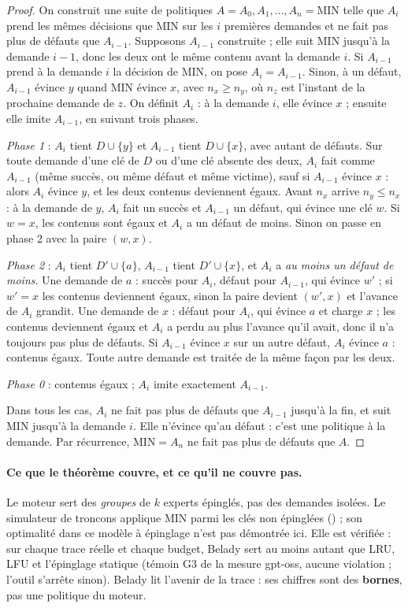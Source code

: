 \begin{proof}
On construit une suite de politiques $A = A_0, A_1, \ldots, A_n = \mathrm{MIN}$ telle que $A_i$ prend les mêmes décisions que MIN sur les $i$ premières demandes et ne fait pas plus de défauts que $A_{i-1}$. Supposons $A_{i-1}$ construite ; elle suit MIN jusqu'à la demande $i-1$, donc les deux ont le même contenu avant la demande $i$. Si $A_{i-1}$ prend à la demande $i$ la décision de MIN, on pose $A_i = A_{i-1}$. Sinon, à un défaut, $A_{i-1}$ évince $y$ quand MIN évince $x$, avec $n_x \ge n_y$, où $n_z$ est l'instant de la prochaine demande de $z$. On définit $A_i$ : à la demande $i$, elle évince $x$ ; ensuite elle imite $A_{i-1}$, en suivant trois phases.

\emph{Phase 1} : $A_i$ tient $D \cup \{y\}$ et $A_{i-1}$ tient $D \cup \{x\}$, avec autant de défauts. Sur toute demande d'une clé de $D$ ou d'une clé absente des deux, $A_i$ fait comme $A_{i-1}$ (même succès, ou même défaut et même victime), sauf si $A_{i-1}$ évince $x$ : alors $A_i$ évince $y$, et les deux contenus deviennent égaux. Avant $n_x$ arrive $n_y \le n_x$ : à la demande de $y$, $A_i$ fait un succès et $A_{i-1}$ un défaut, qui évince une clé $w$. Si $w = x$, les contenus sont égaux et $A_i$ a un défaut de moins. Sinon on passe en phase 2 avec la paire $(w, x)$.

\emph{Phase 2} : $A_i$ tient $D' \cup \{a\}$, $A_{i-1}$ tient $D' \cup \{x\}$, et $A_i$ a \emph{au moins un défaut de moins}. Une demande de $a$ : succès pour $A_i$, défaut pour $A_{i-1}$, qui évince $w'$ ; si $w' = x$ les contenus deviennent égaux, sinon la paire devient $(w', x)$ et l'avance de $A_i$ grandit. Une demande de $x$ : défaut pour $A_i$, qui évince $a$ et charge $x$ ; les contenus deviennent égaux et $A_i$ a perdu au plus l'avance qu'il avait, donc il n'a toujours pas plus de défauts. Si $A_{i-1}$ évince $x$ sur un autre défaut, $A_i$ évince $a$ : contenus égaux. Toute autre demande est traitée de la même façon par les deux.

\emph{Phase 0} : contenus égaux ; $A_i$ imite exactement $A_{i-1}$.

Dans tous les cas, $A_i$ ne fait pas plus de défauts que $A_{i-1}$ jusqu'à la fin, et suit MIN jusqu'à la demande $i$. Elle n'évince qu'au défaut : c'est une politique à la demande. Par récurrence, $\mathrm{MIN} = A_n$ ne fait pas plus de défauts que $A$.
\end{proof}

\paragraph{Ce que le théorème couvre, et ce qu'il ne couvre pas.} Le moteur sert des \emph{groupes} de $k$ experts épinglés, pas des demandes isolées. Le simulateur de troncons applique MIN parmi les clés non épinglées () ; son optimalité dans ce modèle à épinglage n'est pas démontrée ici. Elle est vérifiée : sur chaque trace réelle et chaque budget, Belady sert au moins autant que LRU, LFU et l'épinglage statique (témoin G3 de la mesure gpt-oss, aucune violation ; l'outil s'arrête sinon). Belady lit l'avenir de la trace : ses chiffres sont des \textbf{bornes}, pas une politique du moteur.

